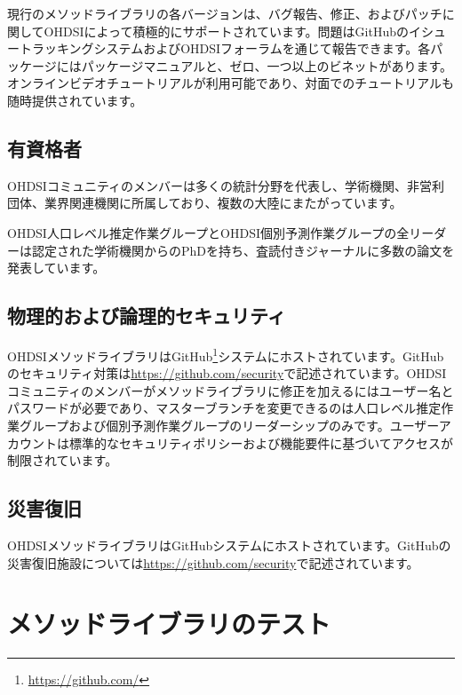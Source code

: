 \documentclass[
  11pt]{book}
\theoremstyle{definition}
\theoremstyle{definition}
\theoremstyle{definition}
\theoremstyle{definition}
\theoremstyle{remark}
\begin{document}
現行のメソッドライブラリの各バージョンは、バグ報告、修正、およびパッチに関してOHDSIによって積極的にサポートされています。問題はGitHubのイシュートラッキングシステムおよびOHDSIフォーラムを通じて報告できます。各パッケージにはパッケージマニュアルと、ゼロ、一つ以上のビネットがあります。オンラインビデオチュートリアルが利用可能であり、対面でのチュートリアルも随時提供されています。

\subsection{有資格者}\label{ux6709ux8cc7ux683cux8005}

OHDSIコミュニティのメンバーは多くの統計分野を代表し、学術機関、非営利団体、業界関連機関に所属しており、複数の大陸にまたがっています。

OHDSI人口レベル推定作業グループとOHDSI個別予測作業グループの全リーダーは認定された学術機関からのPhDを持ち、査読付きジャーナルに多数の論文を発表しています。

\subsection{物理的および論理的セキュリティ}\label{ux7269ux7406ux7684ux304aux3088ux3073ux8ad6ux7406ux7684ux30bbux30adux30e5ux30eaux30c6ux30a3}

OHDSIメソッドライブラリはGitHub\footnote{\url{https://github.com/}}システムにホストされています。GitHubのセキュリティ対策は\url{https://github.com/security}で記述されています。OHDSIコミュニティのメンバーがメソッドライブラリに修正を加えるにはユーザー名とパスワードが必要であり、マスターブランチを変更できるのは人口レベル推定作業グループおよび個別予測作業グループのリーダーシップのみです。ユーザーアカウントは標準的なセキュリティポリシーおよび機能要件に基づいてアクセスが制限されています。

\subsection{災害復旧}\label{ux707dux5bb3ux5fa9ux65e7}

OHDSIメソッドライブラリはGitHubシステムにホストされています。GitHubの災害復旧施設については\url{https://github.com/security}で記述されています。

\section{メソッドライブラリのテスト}\label{ux30e1ux30bdux30c3ux30c9ux30e9ux30a4ux30d6ux30e9ux30eaux306eux30c6ux30b9ux30c8}
\end{document}
